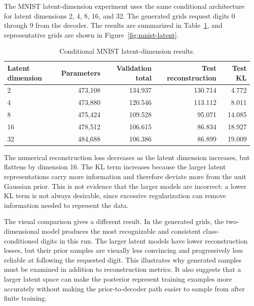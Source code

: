 \documentclass[11pt]{article}
\begin{document}
The MNIST latent-dimension experiment uses the same conditional architecture
for latent dimensions 2, 4, 8, 16, and 32. The generated grids request digits
0 through 9 from the decoder. The results are summarized in
Table~\ref{tab:mnist-latent}, and representative grids are shown in
Figure~\ref{fig:mnist-latent}.

\begin{table}[H]
\centering
\caption{Conditional MNIST latent-dimension results.}
\label{tab:mnist-latent}
\begin{tabular}{lrrrr}
\toprule
Latent dimension & Parameters & Validation total & Test reconstruction & Test KL \\
\midrule
2 & 473,108 & 134.937 & 130.714 & 4.772 \\
4 & 473,880 & 120.546 & 113.112 & 8.011 \\
8 & 475,424 & 109.528 & 95.071 & 14.085 \\
16 & 478,512 & 106.615 & 86.834 & 18.927 \\
32 & 484,688 & 106.386 & 86.899 & 19.009 \\
\bottomrule
\end{tabular}
\end{table}

The numerical reconstruction loss decreases as the latent
dimension increases, but flattens by dimension 16.
The KL term increases because the larger latent representations carry more
information and therefore deviate more from the unit Gaussian prior. This is
not evidence that the larger models are incorrect: a lower KL term is not
always desirable, since excessive regularization can remove information needed
to represent the data.

The visual comparison gives a different result. In the generated grids, the
two-dimensional model produces the most recognizable and consistent
class-conditioned digits in this run. The larger latent models have lower
reconstruction losses, but their prior samples are visually less convincing
and progressively less reliable at following the requested digit. This
illustrates why generated samples must be examined in addition to
reconstruction metrics. It also suggests that a larger latent space can make
the posterior represent training examples more accurately without making the
prior-to-decoder path easier to sample from after finite training.
\end{document}
